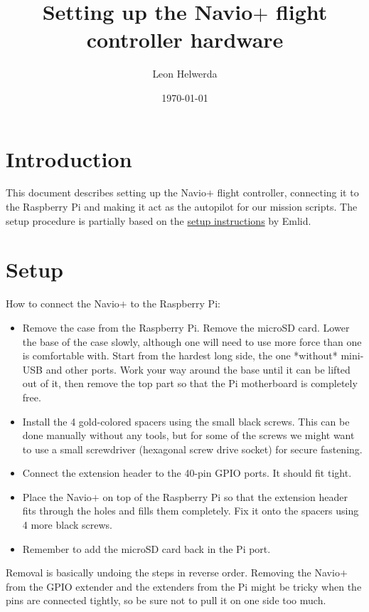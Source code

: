 \documentclass{article}
\newcommand{\navio}{Navio$\stackrel{}{+}$}
\begin{document}
\title{Setting up the \navio{} flight controller hardware}
\author{Leon Helwerda}
\date{\today}

\maketitle

\section{Introduction}
This document describes setting up the \navio{} flight controller, connecting 
it to the Raspberry Pi and making it act as the autopilot for our mission 
scripts. The setup procedure is partially based on the 
\href{http://docs.emlid.com/navio/Navio-APM/hardware-setup-navio-plus/}{setup 
instructions} by Emlid.

\section{Setup}
How to connect the \navio{} to the Raspberry Pi:

\begin{itemize}
  \item Remove the case from the Raspberry Pi. Remove the microSD card. Lower 
        the base of the case slowly, although one will need to use more force 
        than one is comfortable with. Start from the hardest long side, the one 
        *without* mini-USB and other ports. Work your way around the base until 
        it can be lifted out of it, then remove the top part so that the Pi 
        motherboard is completely free.
  \item Install the 4 gold-colored spacers using the small black screws. This 
        can be done manually without any tools, but for some of the screws we 
        might want to use a small screwdriver (hexagonal screw drive socket) 
        for secure fastening.
  \item Connect the extension header to the 40-pin GPIO ports. It should fit 
        tight.
  \item Place the \navio{} on top of the Raspberry Pi so that the extension 
        header fits through the holes and fills them completely. Fix it onto 
        the spacers using 4 more black screws.
  \item Remember to add the microSD card back in the Pi port.
\end{itemize}

Removal is basically undoing the steps in reverse order. Removing the \navio{} 
from the GPIO extender and the extenders from the Pi might be tricky when the 
pins are connected tightly, so be sure not to pull it on one side too much.
\end{document}
